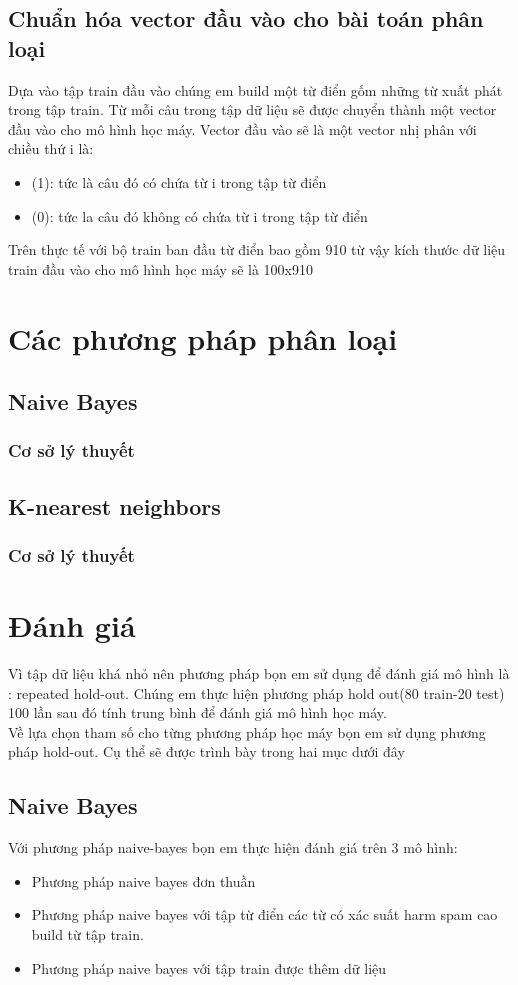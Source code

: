 \documentclass[a4paper,12pt]{report}
\begin{document}
\section{Chuẩn hóa vector đầu vào cho bài toán phân loại}
Dựa vào tập train đầu vào chúng em build một từ điển gốm những từ xuất phát trong tập train. Từ mỗi câu trong tập dữ liệu sẽ được chuyển thành một vector đầu vào cho mô hình học máy. Vector đầu vào sẽ là một vector nhị phân với chiều thứ i là: 
\begin{itemize}
\item (1): tức là câu đó có chứa từ i trong tập từ điển
\item (0): tức la câu đó không có chứa từ i trong tập từ điển
\end{itemize}

Trên thực tế với bộ train ban đầu từ điển bao gồm 910 từ vậy kích thước dữ liệu train đầu vào cho mô hình học máy sẽ là 100x910

\chapter{Các phương pháp phân loại}
\section{Naive Bayes}
\subsection{Cơ sở lý thuyết}
\section{K-nearest neighbors}
\subsection{Cơ sở lý thuyết}
\chapter{Đánh giá}
Vì tập dữ liệu khá nhỏ nên phương pháp bọn em sử dụng để đánh giá mô hình là : repeated hold-out. Chúng em thực hiện phương pháp hold out(80 train-20 test) 100 lần sau đó tính trung bình để đánh giá mô hình học máy.\\

Về lựa chọn tham số cho từng phương pháp học máy bọn em sử dụng phương pháp hold-out. Cụ thể sẽ được trình bày trong hai mục dưới đây
\section{Naive Bayes}
Với phương pháp naive-bayes bọn em thực hiện đánh giá trên 3 mô hình:
\begin{itemize}
\item Phương pháp naive bayes đơn thuần
\item Phương pháp naive bayes với tập từ điển các từ có xác suất harm spam cao build từ tập train.
\item Phương pháp naive bayes với tập train được thêm dữ liệu
\end{itemize}
\end{document}
